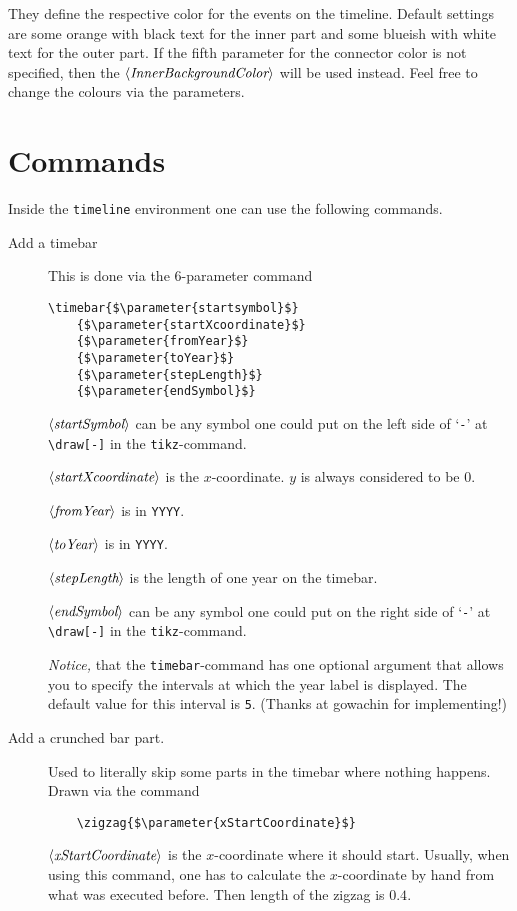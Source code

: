 \documentclass{article}
\newcommand{\parameter}[1]{\langle\normalfont\textit{#1}\rangle}
\begin{document}
They define the respective color for the events on the timeline.
Default settings are some orange  with black text for the inner part and some blueish  with white text for the outer part. 
If the fifth parameter for the connector color is not specified, then the $\parameter{InnerBackgroundColor}$ will be used instead.
Feel free to change the colours via the parameters.

\section{Commands}
Inside the \texttt{timeline} environment one can use the following commands.
\begin{description}
	\item[Add a timebar] This is done via the 6-parameter command
\begin{lstlisting}
\timebar{$\parameter{startsymbol}$}
	{$\parameter{startXcoordinate}$}
	{$\parameter{fromYear}$}
	{$\parameter{toYear}$}
	{$\parameter{stepLength}$}
	{$\parameter{endSymbol}$}
\end{lstlisting}
		$\parameter{startSymbol}$ can be any symbol one could put on the left side of `\verb'-'' at \verb'\draw[-]' in the \texttt{tikz}-command.
		
		$\parameter{startXcoordinate}$ is the $x$-coordinate. $y$ is always considered to be $0$.
		
		$\parameter{fromYear}$ is in \texttt{YYYY}.
		
		$\parameter{toYear}$ is in \texttt{YYYY}.
		
		$\parameter{stepLength}$ is the length of one year on the timebar.
		
		$\parameter{endSymbol}$ can be any symbol one could put on the right side of `\verb'-'' at \verb'\draw[-]' in the \texttt{tikz}-command.
		
	\emph{Notice,} that the \texttt{timebar}-command has one optional argument that allows you to specify the intervals at which the year label is displayed. 
	The default value for this interval is \texttt{5}. (Thanks at gowachin for implementing!)
	\item[Add a crunched bar part.] Used to literally skip some parts in the timebar where nothing happens. Drawn via the command
\begin{lstlisting}
	\zigzag{$\parameter{xStartCoordinate}$}
\end{lstlisting}
$\parameter{xStartCoordinate}$ is the $x$-coordinate where it should start. Usually, when using this command, one has to calculate the $x$-coordinate by hand from what was executed before.
Then length of the zigzag is $0.4$.


\end{description}
\end{document}
